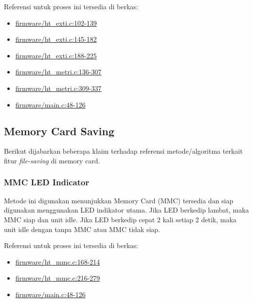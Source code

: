 \documentclass[12pt,]{article}
\begin{document}
	Referensi untuk proses ini tersedia di berkas:
	\begin{itemize}
		\item \href{https://github.com/VibrasticLab/pikoakustik/blob/stm32f401re_3pin/firmware/ht_exti.c#L102-L139}{firmware/ht\_exti.c:102-139}
		\item \href{https://github.com/VibrasticLab/pikoakustik/blob/stm32f401re_3pin/firmware/ht_exti.c#L145-L182}{firmware/ht\_exti.c:145-182}
		\item \href{https://github.com/VibrasticLab/pikoakustik/blob/stm32f401re_3pin/firmware/ht_exti.c#L188-L225}{firmware/ht\_exti.c:188-225}
		\item \href{https://github.com/VibrasticLab/pikoakustik/blob/stm32f401re_3pin/firmware/ht_metri.c#L136-L307}{firmware/ht\_metri.c:136-307}
		\item \href{https://github.com/VibrasticLab/pikoakustik/blob/stm32f401re_3pin/firmware/ht_metri.c#L309-L337}{firmware/ht\_metri.c:309-337}
		\item \href{https://github.com/VibrasticLab/pikoakustik/blob/stm32f401re_3pin/firmware/main.c#L48-L126}{firmware/main.c:48-126}
	\end{itemize}

	\newpage
	\subsection{Memory Card Saving}
	
	Berikut dijabarkan beberapa klaim terhadap referensi metode/algoritma terkait fitur \textit{file-saving} di memory card.
	
	\subsubsection{MMC LED Indicator}
	
	Metode ini digunakan menunjukkan Memory Card (MMC) tersedia dan siap digunakan menggunakan LED indikator utama.
	Jika LED berkedip lambat, maka MMC siap dan unit idle.
	Jika LED berkedip cepat 2 kali setiap 2 detik, maka unit idle dengan tanpa MMC atau MMC tidak siap.
	
	Referensi untuk proses ini tersedia di berkas:
	\begin{itemize}
		\item \href{https://github.com/VibrasticLab/pikoakustik/blob/stm32f401re_3pin/firmware/ht_mmc.c#L168-L214}{firmware/ht\_mmc.c:168-214}
		\item \href{https://github.com/VibrasticLab/pikoakustik/blob/stm32f401re_3pin/firmware/ht_mmc.c#L216-L279}{firmware/ht\_mmc.c:216-279}
		\item \href{https://github.com/VibrasticLab/pikoakustik/blob/stm32f401re_3pin/firmware/main.c#L48-L126}{firmware/main.c:48-126}
	\end{itemize}
	
\end{document}
